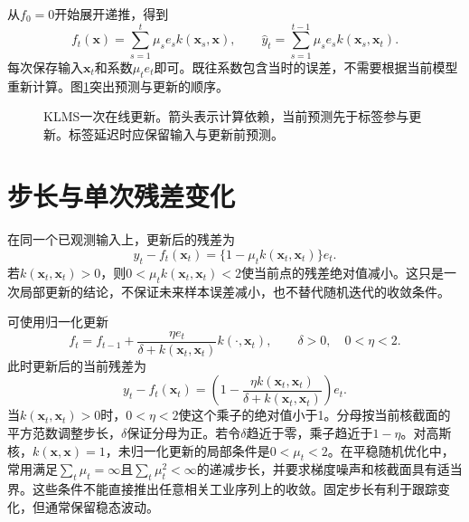 从$f_0=0$开始展开递推，得到
\begin{equation}
 f_t(\bm x)=\sum_{s=1}^t\mu_s e_s k(\bm x_s,\bm x),\qquad
 \hat y_t=\sum_{s=1}^{t-1}\mu_s e_s k(\bm x_s,\bm x_t).
 \label{eq:klms-expansion}
\end{equation}
每次保存输入$\bm x_t$和系数$\mu_t e_t$即可。既往系数包含当时的误差，不需要根据当前模型重新计算。图\ref{fig:klms-online-update}突出预测与更新的顺序。

\begin{figure}[htbp]
\centering
{}
\caption{KLMS一次在线更新。箭头表示计算依赖，当前预测先于标签参与更新。标签延迟时应保留输入与更新前预测。}
\label{fig:klms-online-update}
\end{figure}

\section{步长与单次残差变化}
在同一个已观测输入上，更新后的残差为
\begin{equation}
 y_t-f_t(\bm x_t)=\{1-\mu_t k(\bm x_t,\bm x_t)\}e_t.
\end{equation}
若$k(\bm x_t,\bm x_t)>0$，则$0<\mu_t k(\bm x_t,\bm x_t)<2$使当前点的残差绝对值减小。这只是一次局部更新的结论，不保证未来样本误差减小，也不替代随机迭代的收敛条件。

可使用归一化更新
\begin{equation}
 f_t=f_{t-1}+\frac{\eta e_t}{\delta+k(\bm x_t,\bm x_t)}k(\cdot,\bm x_t),
 \qquad\delta>0,\quad0<\eta<2.
\end{equation}
此时更新后的当前残差为
\[
 y_t-f_t(\bm x_t)=\left(1-\frac{\eta k(\bm x_t,\bm x_t)}{\delta+k(\bm x_t,\bm x_t)}\right)e_t.
\]
当$k(\bm x_t,\bm x_t)>0$时，$0<\eta<2$使这个乘子的绝对值小于1。分母按当前核截面的平方范数调整步长，$\delta$保证分母为正。若令$\delta$趋近于零，乘子趋近于$1-\eta$。对高斯核，$k(\bm x,\bm x)=1$，未归一化更新的局部条件是$0<\mu_t<2$。在平稳随机优化中，常用满足$\sum_t\mu_t=\infty$且$\sum_t\mu_t^2<\infty$的递减步长，并要求梯度噪声和核截面具有适当界。这些条件不能直接推出任意相关工业序列上的收敛。固定步长有利于跟踪变化，但通常保留稳态波动。

